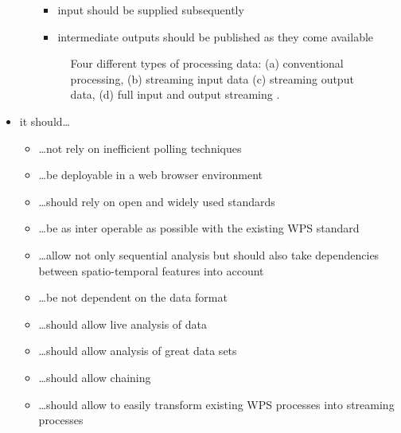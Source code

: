 \begin{itemize}
\begin{itemize}
			\begin{itemize}
				\item input should be supplied subsequently
				\item intermediate outputs should be published as they come available
			\end{itemize}
			\begin{figure}[!htb]
				\centering
				
				\caption{\label{fig:streaming}Four different types of processing data: (a) conventional processing, (b) streaming input data (c) streaming output data, (d) full input and output streaming \citep[based on][]{foerster2012live}.}
			\end{figure}
		\end{itemize}
		\item it should\dots
		\begin{itemize}
			\item \dots not rely on inefficient polling techniques
			\item \dots be deployable in a web browser environment
			\item \dots should rely on open and widely used standards
			\item \dots be as inter operable as possible with the existing WPS standard
			\item \dots allow not only sequential analysis but should also take dependencies between spatio-temporal features into account
			\item \dots be not dependent on the data format
			\item \dots should allow live analysis of data
			\item \dots should allow analysis of great data sets
			\item \dots should allow chaining
			\item \dots should allow to easily transform existing WPS processes into streaming processes
		\end{itemize}


\end{itemize}
